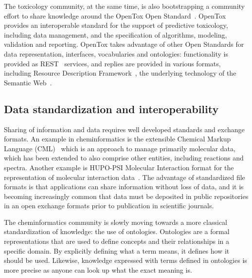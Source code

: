 \documentclass[11pt]{book}
\begin{document}
The toxicology community, at the same time, is also bootstrapping
a community effort to share knowledge around the OpenTox Open Standard~\cite{Hardy2010}.
OpenTox provides an interoperable standard for the support of predictive toxicology,
including data management, and the specification of algorithms, modeling, validation and
reporting. OpenTox takes advantage of other Open Standards for data representation,
interfaces, vocabularies and ontologies: functionality is provided as REST~\cite{fielding:2000} services,
and replies are provided in various formats, including Resource Description
Framework~\cite{Carroll:04:RDF},
the underlying technology of the Semantic Web~\cite{BernersLee2001}.

\subsection{Data standardization and interoperability}

Sharing of information and data requires well developed standards and exchange formats.
An example in cheminformatics is the extensible Chemical Markup Language
(CML)~\cite{MurrayRust1999} which
is an approach to manage primarily molecular data, which has been extended to also
comprise other entities, including reactions and spectra. Another example is HUPO-PSI
Molecular Interaction format for the representation of molecular interaction
data~\cite{Orchard:2010uq}. The advantage of standardized file formats is that
applications can share information without loss of data, and it is becoming
increasingly common that data must be deposited in public repositories in an
open exchange formats prior to publication in scientific journals.

The cheminformatics community is slowly moving towards a more classical
standardization of knowledge: the use of ontologies. Ontologies are a formal
representations that are used to define concepts and their relationships in a
specific domain. By explicitly defining what a term means, it defines how
it should be used. Likewise, knowledge expressed with terms defined in
ontologies is more precise as anyone can look up what the exact meaning is.
\end{document}
